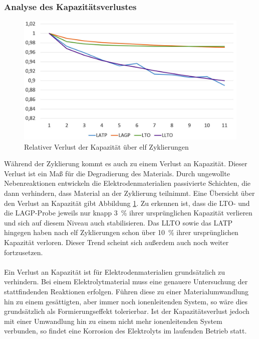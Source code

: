 \documentclass[a4paper, 11pt, headsepline,footsepline,twoside,abstract]{scrbook}
\begin{document}
\subsubsection{Analyse des Kapazitätsverlustes}
\begin{figure}
	\centering
	\includegraphics[width=1.00\columnwidth]{images/kapazitaetsverlust.jpg}
	\caption{Relativer Verlust der Kapazität über elf Zyklierungen}
	\label{kapazitaetsverlust}
\end{figure}
Während der Zyklierung kommt es auch zu einem Verlust an Kapazität. Dieser Verlust ist ein Maß für die Degradierung des Materials. Durch ungewollte Nebenreaktionen entwickeln die Elektrodenmaterialien passivierte Schichten, die dann verhindern, dass Material an der Zyklierung teilnimmt. Eine Übersicht über den Verlust an Kapazität gibt Abbildung \ref{kapazitaetsverlust}. Zu erkennen ist, dass die LTO- und die LAGP-Probe jeweils nur knapp \SI{3}{\percent} ihrer ursprünglichen Kapazität verlieren und sich auf diesem Niveau auch stabilisieren. Das LLTO sowie das LATP hingegen haben nach elf Zyklierungen schon über \SI{10}{\percent} ihrer ursprünglichen Kapazität verloren. Dieser Trend scheint sich außerdem auch noch weiter fortzusetzen.
\\\\
Ein Verlust an Kapazität ist für Elektrodenmaterialien grundsätzlich zu verhindern. Bei einem Elektrolytmaterial muss eine genauere Untersuchung der stattfindenden Reaktionen erfolgen. Führen diese zu einer Materialumwandlung hin zu einem gesättigten, aber immer noch ionenleitenden System, so wäre dies grundsätzlich als Formierungseffekt tolerierbar. Ist der Kapazitätsverlust jedoch mit einer Umwandlung hin zu einem nicht mehr ionenleitenden System verbunden, so findet eine Korrosion des Elektrolyts im laufenden Betrieb statt.
\end{document}
